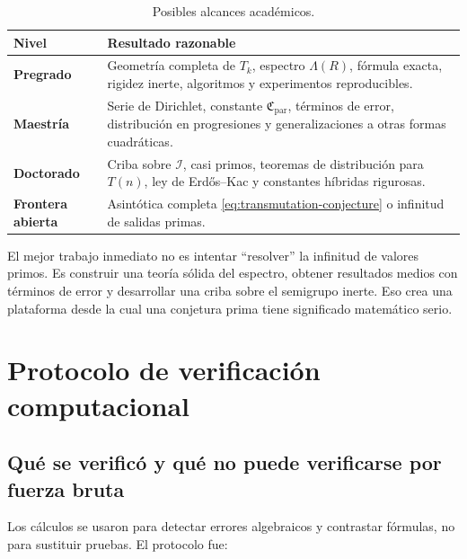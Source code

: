 \documentclass[11pt,a4paper,openany]{report}
\newcommand{\Iset}{\mathcal{I}}
\newcommand{\Lam}{\Lambda}
\begin{document}
\begin{table}[H]
\centering
\caption{Posibles alcances académicos.}
\begin{tabularx}{\textwidth}{>{\bfseries}p{3cm}X}
\toprule
Nivel&Resultado razonable\\
\midrule
Pregrado&Geometría completa de \(T_k\), espectro \(\Lam(R)\), fórmula exacta, rigidez inerte, algoritmos y experimentos reproducibles.\\
Maestría&Serie de Dirichlet, constante \(\mathfrak C_{\mathrm{par}}\), términos de error, distribución en progresiones y generalizaciones a otras formas cuadráticas.\\
Doctorado&Criba sobre \(\Iset\), casi primos, teoremas de distribución para \(T(n)\), ley de Erdős--Kac y constantes híbridas rigurosas.\\
Frontera abierta&Asintótica completa \eqref{eq:transmutation-conjecture} o infinitud de salidas primas.\\
\bottomrule
\end{tabularx}
\end{table}

\begin{rigorousbox}
El mejor trabajo inmediato no es intentar ``resolver'' la infinitud de valores primos. Es construir una teoría sólida del espectro, obtener resultados medios con términos de error y desarrollar una criba sobre el semigrupo inerte. Eso crea una plataforma desde la cual una conjetura prima tiene significado matemático serio.
\end{rigorousbox}

\appendix
\chapter{Protocolo de verificación computacional}

\section{Qué se verificó y qué no puede verificarse por fuerza bruta}

Los cálculos se usaron para detectar errores algebraicos y contrastar fórmulas, no para sustituir pruebas. El protocolo fue:
\end{document}
